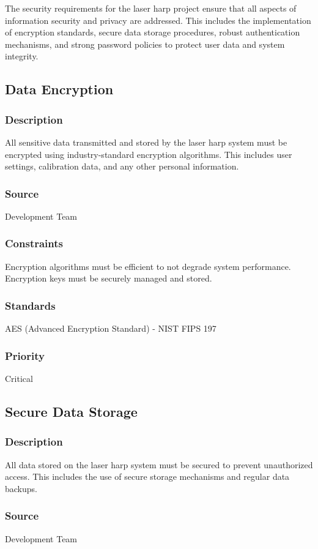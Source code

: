The security requirements for the laser harp project ensure that all aspects of information security and privacy are addressed. This includes the implementation of encryption standards, secure data storage procedures, robust authentication mechanisms, and strong password policies to protect user data and system integrity.

\subsection{Data Encryption}
\subsubsection{Description}
All sensitive data transmitted and stored by the laser harp system must be encrypted using industry-standard encryption algorithms. This includes user settings, calibration data, and any other personal information.
\subsubsection{Source}
Development Team
\subsubsection{Constraints}
Encryption algorithms must be efficient to not degrade system performance. Encryption keys must be securely managed and stored.
\subsubsection{Standards}
AES (Advanced Encryption Standard) - NIST FIPS 197
\subsubsection{Priority}
Critical


\subsection{Secure Data Storage}
\subsubsection{Description}
All data stored on the laser harp system must be secured to prevent unauthorized access. This includes the use of secure storage mechanisms and regular data backups.
\subsubsection{Source}
Development Team
